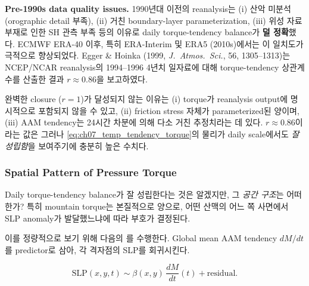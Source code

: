 \medskip



\noindent\textbf{Pre-1990s data quality issues.}
1990년대 이전의 reanalysis는 (i) 산악 미분석 (orographic detail 부족),
(ii) 거친 boundary-layer parameterization, (iii) 위성 자료 부재로 인한 SH
관측 부족 등의 이유로 daily torque-tendency balance가 \textbf{덜 정확}했다.
ECMWF ERA-40 이후, 특히 ERA-Interim 및 ERA5 (2010s)에서는 이 일치도가
극적으로 향상되었다.  Egger \& Hoinka (1999, \textit{J.\ Atmos.\ Sci.},
56, 1305--1313)는 NCEP/NCAR reanalysis의 1994--1996 4년치 일자료에 대해
torque-tendency 상관계수를 산출한 결과 $r\approx 0.86$을 보고하였다.

\begin{remark}
완벽한 closure ($r=1$)가 달성되지 않는 이유는 (i) 
torque가 reanalysis output에 명시적으로 포함되지 않을 수 있고, (ii) friction
stress 자체가 parameterized된 양이며, (iii) AAM tendency는 24시간 차분에
의해 다소 거친 추정치라는 데 있다.  $r\approx 0.86$이라는 값은 그러나
\eqref{eq:ch07_temp_tendency_torque}의 물리가 daily scale에서도 \emph{잘
성립함}을 보여주기에 충분히 높은 수치다.
\end{remark}


\subsubsection{Spatial Pattern of Pressure Torque}

Daily torque-tendency balance가 잘 성립한다는 것은 알겠지만, 그 \emph{공간
구조}는 어떠한가?  특히 mountain torque는 본질적으로  양으로,
어떤 산맥의 어느 쪽 사면에서 SLP anomaly가 발달했느냐에 따라 부호가 결정된다.

이를 정량적으로 보기 위해 다음의 를 수행한다.
Global mean AAM tendency $dM/dt$를 predictor로 삼아, 각 격자점의 SLP를
회귀시킨다.

\begin{equation}\label{eq:ch07_temp_regression}
  \text{SLP}(x,y,t) \sim \beta(x,y)\,\frac{dM}{dt}(t) + \text{residual}.
\end{equation}



